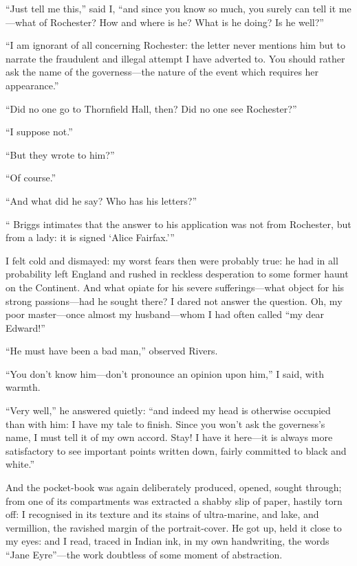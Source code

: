 \enquote{Just tell me this,} said I, \enquote{and since you know so
	much, you surely can tell it me---what of \Mr{} Rochester? How and where
	is he? What is he doing? Is he well?}

\enquote{I am ignorant of all concerning \Mr{} Rochester: the letter never
	mentions him but to narrate the fraudulent and illegal attempt I have
	adverted to. You should rather ask the name of the governess---the
	nature of the event which requires her appearance.}

\enquote{Did no one go to Thornfield Hall, then? Did no one see \Mr{}
	Rochester?}

\enquote{I suppose not.}

\enquote{But they wrote to him?}

\enquote{Of course.}

\enquote{And what did he say? Who has his letters?}

\enquote{\Mr{} Briggs intimates that the answer to his application was not
	from \Mr{} Rochester, but from a lady: it is signed \enquote{Alice
		Fairfax.}}

I felt cold and dismayed: my worst fears then were probably true: he had
in all probability left England and rushed in reckless desperation to
some former haunt on the Continent. And what opiate for his severe
sufferings---what object for his strong passions---had he sought there?
I dared not answer the question. Oh, my poor master---once almost my
husband---whom I had often called \enquote{my dear Edward!}

\enquote{He must have been a bad man,} observed \Mr{} Rivers.

\enquote{You don't know him---don't pronounce an opinion upon him,} I
said, with warmth.

\enquote{Very well,} he answered quietly: \enquote{and indeed my head is
	otherwise occupied than with him: I have my tale to finish. Since you
	won't ask the governess's name, I must tell it of my own accord. Stay!
	I have it here---it is always more satisfactory to see important points
	written down, fairly committed to black and white.}

And the pocket-book was again deliberately produced, opened, sought
through; from one of its compartments was extracted a shabby slip of
paper, hastily torn off: I recognised in its texture and its stains of
ultra-marine, and lake, and vermillion, the ravished margin of the
portrait-cover. He got up, held it close to my eyes: and I read, traced
in Indian ink, in my own handwriting, the words \enquote{{Jane Eyre}}---the
work doubtless of some moment of abstraction.

